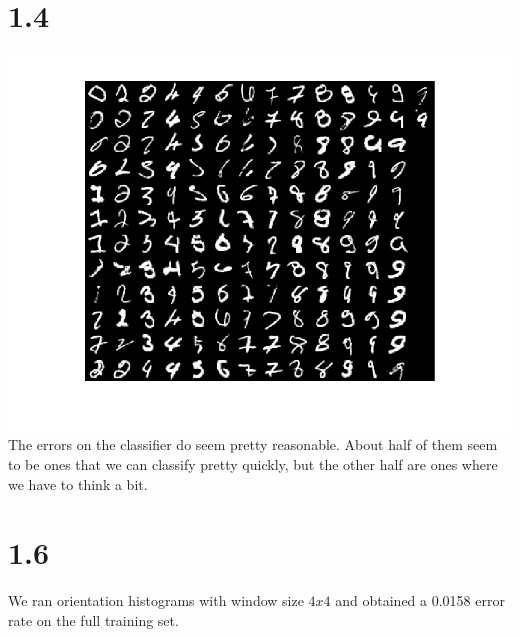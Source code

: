 \documentclass[11pt]{article}
\begin{document}
\section*{1.4}
\includegraphics[scale=0.7]{diagrams/misclassifcation60k}\\
The errors on the classifier do seem pretty reasonable. About half of them seem to be ones that we can classify pretty quickly, but the other half are ones where we have to think a bit.
\newpage
\section*{1.6}
We ran orientation histograms with window size $4x4$ and obtained a 0.0158 error rate on the full training set.
\newpage
\end{document}
